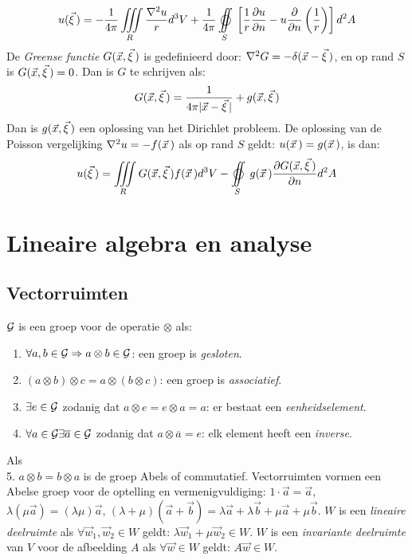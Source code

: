 \[
u(\vvec{\xi})=-\frac{1}{4\pi}\mathop{\iiint}\limits_{\!\!\!R}\frac{\nabla^2u}{r}d^3V+
\frac{1}{4\pi}\mathop{\oiint}\limits_{\!\!\!S}\left[\frac{1}{r}\Q{u}{n}-u\Q{}{n}\left(\frac{1}{r}\right)\right]d^2A
\]
De {\it Greense functie} $G(\vec{x},\vec{\xi}\,)$ is gedefinieerd door:
$\nabla^2G=-\delta(\vec{x}-\vec{\xi}\,)$, en op rand $S$ is $G(\vec{x},\vec{\xi}\,)=0$.
Dan is $G$ te schrijven als:
\[
G(\vec{x},\vec{\xi}\,)=\frac{1}{4\pi|\vec{x}-\vec{\xi}\,|}+g(\vec{x},\vec{\xi}\,)
\]
Dan is $g(\vec{x},\vec{\xi}\,)$ een oplossing van het Dirichlet probleem. De
oplossing van de Poisson vergelijking $\nabla^2u=-f(\vec{x}\,)$ als op rand $S$
geldt: $u(\vec{x}\,)=g(\vec{x}\,)$, is dan:
\[
u(\vvec{\xi})=\mathop{\iiint}\limits_{\!\!\!R}G(\vec{x},\vvec{\xi})f(\vvec{x})d^3V-
\mathop{\oiint}\limits_{\!\!\!S}g(\vvec{x})\Q{G(\vec{x},\vvec{\xi})}{n}d^2A
\]


\chapter{Lineaire algebra en analyse}
\section{Vectorruimten}
$\cal G$ is een groep voor de operatie $\otimes$ als:
\begin{enumerate}
\item $\forall a,b\in{\cal G}\Rightarrow a\otimes b\in\cal G$: een groep is
      {\it gesloten}.
\item $(a\otimes b)\otimes c = a\otimes (b\otimes c)$: een groep is
      {\it associatief}.
\item $\exists e\in{\cal G}$ zodanig dat $a\otimes e=e\otimes a=a$: er bestaat
      een {\it eenheidselement}.
\item $\forall a\in{\cal G}\exists \overline{a}\in{\cal G}$ zodanig dat $a\otimes\overline{a}=e$:
      elk element heeft een {\it inverse}.
\end{enumerate}
Als\\
\hspace*{4.5mm}5. $a\otimes b=b\otimes a$
\npar
is de groep Abels of commutatief.
Vectorruimten vormen een Abelse groep voor de optelling en vermenigvuldiging:
$1\cdot\vec{a}=\vec{a}$, $\lambda(\mu\vec{a})=(\lambda\mu)\vec{a}$,
$(\lambda+\mu)(\vec{a}+\vec{b})=\lambda\vec{a}+\lambda\vec{b}+\mu\vec{a}+\mu\vec{b}$.
\npar
$W$ is een {\it lineaire deelruimte} als $\forall \vec{w}_1,\vec{w}_2\in W$
geldt: $\lambda\vec{w}_1+\mu\vec{w}_2\in W$.
\npar
$W$ is een {\it invariante deelruimte} van $V$ voor de afbeelding $A$ als
$\forall \vec{w}\in W$ geldt: $A\vec{w}\in W$.

